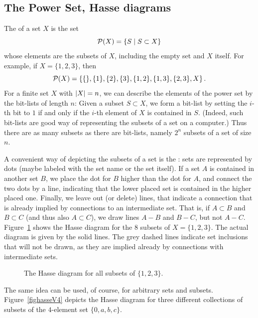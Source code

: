 \subsection{The Power Set, Hasse diagrams}

The  of a set $X$ is the set
\[
{\cal P}(X)=\{S\mid S\subset X\}
\]
whose elements are the subsets of $X$, including the empty set and $X$
itself. For example, if $X=\{1,2,3\}$, then
\[
{\cal P}(X)=\left\{\{\},\{1\},\{2\},\{3\},\{1,2\},\{1,3\},\{2,3\},X\right\}.
\]
For a finite set $X$ with $\sz{X}=n$, we can describe the elements of the
power set by the bit-lists of length $n$: Given a subset $S\subset X$, we
form a bit-list by setting the $i$-th bit to $1$ if and only if the $i$-th
element of $X$ is contained in $S$. (Indeed, such bit-lists are good way of
representing the subsets of a set on a computer.) Thus there are as many
subsets as there are bit-lists, namely $2^n$ subsets of a set of size $n$.
\medskip

A convenient way of depicting the subsets of a set is the : sets are represented by dots (maybe labeled with the set name or
the set itself). If a set $A$ is contained in another set $B$, we place the
dot for $B$ higher than the dot for $A$, and connect the two dots by a line,
indicating that the lower placed set is contained in the higher placed one.
Finally, we leave out (or delete) lines, that indicate a connection that is
already implied by connections to an intermediate set. That is, if $A\subset
B$ and $B\subset C$ (and thus also $A\subset C$), we draw lines $A-B$ and
$B-C$, but not $A-C$. Figure~\ref{fighasse3set} shows the Hasse diagram for
the $8$ subsets of $X=\{1,2,3\}$. The actual diagram is given by the solid
lines. The grey dashed lines indicate set inclusions that will not be drawn,
as they are implied already by connections with intermediate sets.

\begin{figure}[t]
\begin{center}
\end{center}
\caption{The Hasse diagram for all subsets of $\{1,2,3\}$.}
\label{fighasse3set}
\end{figure}

The same idea can be used, of course, for arbitrary sets and subsets.
Figure~\ref{fighasseV4} depicts the Hasse diagram for three different
collections of subsets of the $4$-element set $\{0,a,b,c\}$.


